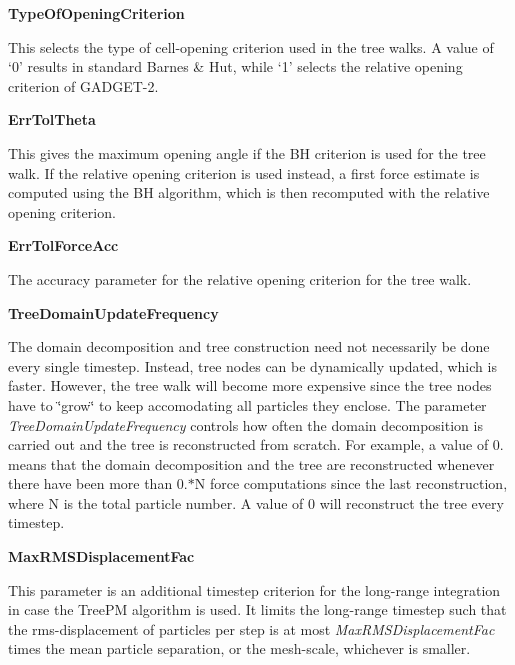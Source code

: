 \begin{DoxyItemize}
\item {\bfseries \-Type\-Of\-Opening\-Criterion} \par
 \-This selects the type of cell-\/opening criterion used in the tree walks. \-A value of `0' results in standard \-Barnes \& \-Hut, while `1' selects the relative opening criterion of \-G\-A\-D\-G\-E\-T-\/2.
\end{DoxyItemize}


\begin{DoxyItemize}
\item {\bfseries \-Err\-Tol\-Theta} \par
 \-This gives the maximum opening angle if the \-B\-H criterion is used for the tree walk. \-If the relative opening criterion is used instead, a first force estimate is computed using the \-B\-H algorithm, which is then recomputed with the relative opening criterion.
\end{DoxyItemize}


\begin{DoxyItemize}
\item {\bfseries \-Err\-Tol\-Force\-Acc} \par
 \-The accuracy parameter for the relative opening criterion for the tree walk.
\end{DoxyItemize}


\begin{DoxyItemize}
\item {\bfseries \-Tree\-Domain\-Update\-Frequency} \par
 \-The domain decomposition and tree construction need not necessarily be done every single timestep. \-Instead, tree nodes can be dynamically updated, which is faster. \-However, the tree walk will become more expensive since the tree nodes have to \char`\"{}grow\char`\"{} to keep accomodating all particles they enclose. \-The parameter {\itshape \-Tree\-Domain\-Update\-Frequency\/} controls how often the domain decomposition is carried out and the tree is reconstructed from scratch. \-For example, a value of 0. means that the domain decomposition and the tree are reconstructed whenever there have been more than 0.$\ast$\-N force computations since the last reconstruction, where \-N is the total particle number. \-A value of 0 will reconstruct the tree every timestep.
\end{DoxyItemize}


\begin{DoxyItemize}
\item {\bfseries \-Max\-R\-M\-S\-Displacement\-Fac} \par
 \-This parameter is an additional timestep criterion for the long-\/range integration in case the \-Tree\-P\-M algorithm is used. \-It limits the long-\/range timestep such that the rms-\/displacement of particles per step is at most {\itshape \-Max\-R\-M\-S\-Displacement\-Fac\/} times the mean particle separation, or the mesh-\/scale, whichever is smaller.
\end{DoxyItemize}


